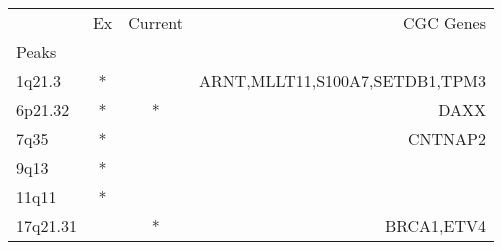 \begin{tabular}{lccr}
\toprule
{} & Ex & Current &                       CGC Genes \\
Peaks    &    &         &                                 \\
\midrule
1q21.3   &  * &         &  ARNT,MLLT11,S100A7,SETDB1,TPM3 \\
6p21.32  &  * &       * &                            DAXX \\
7q35     &  * &         &                         CNTNAP2 \\
9q13     &  * &         &                                 \\
11q11    &  * &         &                                 \\
17q21.31 &    &       * &                      BRCA1,ETV4 \\
\bottomrule
\end{tabular}
